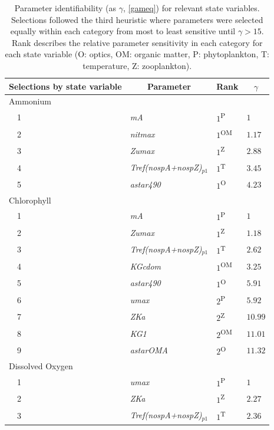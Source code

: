 \documentclass[letterpaper,12pt,oneside]{article}\usepackage[]{graphicx}\usepackage[]{color}
\begin{document}
\begin{table}[!tbp]
{\footnotesize
\caption{Parameter identifiability (as $\gamma$, \cref{gameq}) for relevant state variables.  Selections followed the third heuristic where parameters were selected equally within each category from most to least sensitive until $\gamma > 15$.  Rank describes the relative parameter sensitivity in each category for each state variable (O: optics, OM: organic matter, P: phytoplankton, T: temperature, Z: zooplankton).\label{tab:heurist3}} 
\begin{center}
\begin{tabular}{llll}
\hline\hline
\multicolumn{1}{l}{Selections by state variable}&\multicolumn{1}{c}{Parameter}&\multicolumn{1}{c}{Rank}&\multicolumn{1}{c}{$\gamma$}\tabularnewline
\hline
{Ammonium}&&&\tabularnewline
~~1&\footnotesize{\textit{mA}}&$1$\textsuperscript{P}&$1$\tabularnewline
~~2&\footnotesize{\textit{nitmax}}&$1$\textsuperscript{OM}&$1.17$\tabularnewline
~~3&\footnotesize{\textit{Zumax}}&$1$\textsuperscript{Z}&$2.88$\tabularnewline
~~4&\footnotesize{\textit{Tref(nospA+nospZ)$_{p1}$}}&$1$\textsuperscript{T}&$3.45$\tabularnewline
~~5&\footnotesize{\textit{astar490}}&$1$\textsuperscript{O}&$4.23$\tabularnewline
\hline
{Chlorophyll}&&&\tabularnewline
~~1&\footnotesize{\textit{mA}}&$1$\textsuperscript{P}&$1$\tabularnewline
~~2&\footnotesize{\textit{Zumax}}&$1$\textsuperscript{Z}&$1.18$\tabularnewline
~~3&\footnotesize{\textit{Tref(nospA+nospZ)$_{p1}$}}&$1$\textsuperscript{T}&$2.62$\tabularnewline
~~4&\footnotesize{\textit{KGcdom}}&$1$\textsuperscript{OM}&$3.25$\tabularnewline
~~5&\footnotesize{\textit{astar490}}&$1$\textsuperscript{O}&$5.91$\tabularnewline
~~6&\footnotesize{\textit{umax}}&$2$\textsuperscript{P}&$5.92$\tabularnewline
~~7&\footnotesize{\textit{ZKa}}&$2$\textsuperscript{Z}&$10.99$\tabularnewline
~~8&\footnotesize{\textit{KG1}}&$2$\textsuperscript{OM}&$11.01$\tabularnewline
~~9&\footnotesize{\textit{astarOMA}}&$2$\textsuperscript{O}&$11.32$\tabularnewline
\hline
{Dissolved Oxygen}&&&\tabularnewline
~~1&\footnotesize{\textit{umax}}&$1$\textsuperscript{P}&$1$\tabularnewline
~~2&\footnotesize{\textit{ZKa}}&$1$\textsuperscript{Z}&$2.27$\tabularnewline
~~3&\footnotesize{\textit{Tref(nospA+nospZ)$_{p1}$}}&$1$\textsuperscript{T}&$2.36$\tabularnewline

\end{tabular}
\end{center}}
\end{table}
\end{document}
